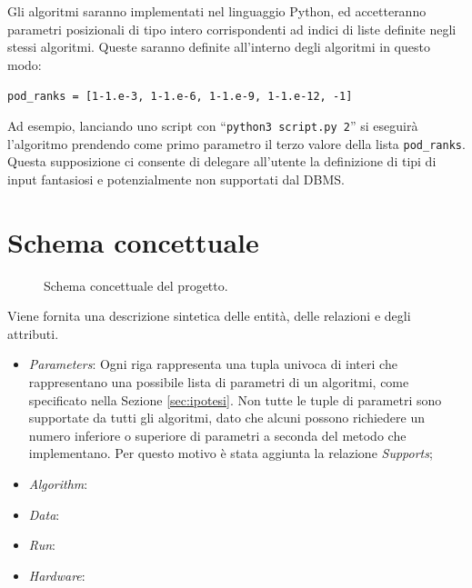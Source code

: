 \documentclass{article}
\begin{document}
Gli algoritmi saranno implementati nel linguaggio Python, ed accetteranno parametri posizionali di tipo intero corrispondenti ad indici di liste definite negli stessi algoritmi. Queste saranno definite all'interno degli algoritmi in questo modo:

\verb|pod_ranks = [1-1.e-3, 1-1.e-6, 1-1.e-9, 1-1.e-12, -1]|

Ad esempio, lanciando uno script con ``\texttt{python3 script.py 2}'' si eseguirà l'algoritmo prendendo come primo parametro il terzo valore della lista \texttt{pod\_ranks}. Questa supposizione ci consente di delegare all'utente la definizione di tipi di input fantasiosi e potenzialmente non supportati dal DBMS.

\section{Schema concettuale}
\begin{figure}[H]
    \caption{Schema concettuale del progetto.}
\end{figure}
Viene fornita una descrizione sintetica delle entità, delle relazioni e degli attributi.
\begin{itemize}
    \item \emph{Parameters}: Ogni riga rappresenta una tupla univoca di interi che rappresentano una possibile lista di parametri di un algoritmi, come specificato nella Sezione \ref{sec:ipotesi}. Non tutte le tuple di parametri sono supportate da tutti gli algoritmi, dato che alcuni possono richiedere un numero inferiore o superiore di parametri a seconda del metodo che implementano. Per questo motivo è stata aggiunta la relazione \emph{Supports};
    \item \emph{Algorithm}:
    \item \emph{Data}:
    \item \emph{Run}:
    \item \emph{Hardware}:
\end{itemize}
\end{document}
